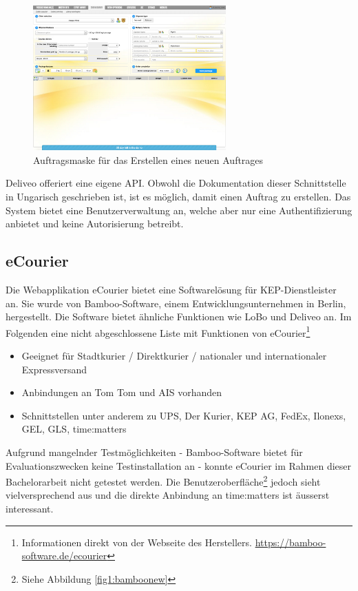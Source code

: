 \begin{figure}[ht]
	\centering
  \includegraphics[width=0.66\textwidth]{images/deliveoNew.png}
	\caption{Auftragsmaske für das Erstellen eines neuen Auftrages}
	\label{fig1:deliveonew}
\end{figure}

Deliveo offeriert eine eigene API. Obwohl die Dokumentation dieser Schnittstelle in Ungarisch geschrieben ist, ist es möglich, damit einen Auftrag zu erstellen. Das System bietet eine Benutzerverwaltung an, welche aber nur eine Authentifizierung anbietet und keine Autorisierung betreibt.

\subsection{eCourier}
Die Webapplikation eCourier bietet eine Softwarelösung für KEP-Dienstleister an. Sie wurde von Bamboo-Software, einem Entwicklungsunternehmen in Berlin, hergestellt. Die Software bietet ähnliche Funktionen wie LoBo und Deliveo an. Im Folgenden eine nicht abgeschlossene Liste mit Funktionen von eCourier\footnote{ Informationen direkt von der Webseite des Herstellers. \url{https://bamboo-software.de/ecourier}}
\begin{itemize}
	\item Geeignet für Stadtkurier / Direktkurier / nationaler  und internationaler Expressversand
	\item Anbindungen an Tom Tom und AIS vorhanden
	\item Schnittstellen unter anderem zu UPS, Der Kurier, KEP AG, FedEx, Ilonexs, GEL, GLS, time:matters
\end{itemize}
Aufgrund mangelnder Testmöglichkeiten - Bamboo-Software bietet für Evaluationszwecken keine Testinstallation an - konnte eCourier im Rahmen dieser Bachelorarbeit nicht getestet werden. Die Benutzeroberfläche\footnote{Siehe Abbildung \ref{fig1:bamboonew}} jedoch sieht vielversprechend aus und die direkte Anbindung an time:matters ist äusserst interessant.

